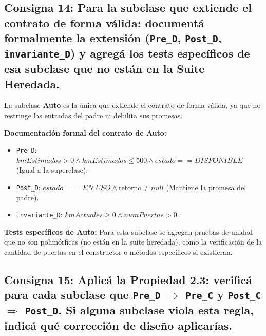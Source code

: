 \subsection{Consigna 14: Para la subclase que extiende el contrato de forma válida: documentá formalmente la extensión (\texttt{Pre\_D}, \texttt{Post\_D}, \texttt{invariante\_D}) y agregá los tests específicos de esa subclase que no están en la Suite Heredada.}

La subclase \textbf{Auto} es la única que extiende el contrato de forma válida, ya que no restringe las entradas del padre ni debilita sus promesas.

\textbf{Documentación formal del contrato de Auto:}
\begin{itemize}
    \item \texttt{Pre_D}: $kmEstimados > 0 \land kmEstimados \le 500 \land estado == DISPONIBLE$ (Igual a la superclase).
    \item \texttt{Post_D}: $estado == EN\_USO \land \text{retorno} \neq null$ (Mantiene la promesa del padre).
    \item \texttt{invariante_D}: $kmActuales \ge 0 \land numPuertas > 0$.
\end{itemize}

\textbf{Tests específicos de Auto:} Para esta subclase se agregan pruebas de unidad que no son polimórficas (no están en la suite heredada), como la verificación de la cantidad de puertas en el constructor o métodos específicos si existieran.

\subsection{Consigna 15: Aplicá la Propiedad 2.3: verificá para cada subclase que \texttt{Pre\_D} $\Rightarrow$ \texttt{Pre\_C} y \texttt{Post\_C} $\Rightarrow$ \texttt{Post\_D}. Si alguna subclase viola esta regla, indicá qué corrección de diseño aplicarías.}

